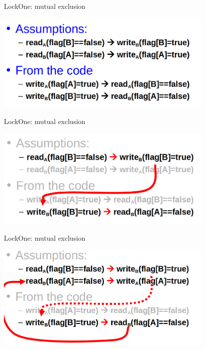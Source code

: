 \begin{frame}[fragile]{LockOne: mutual exclusion}
\begin{center}
  \includegraphics[width=0.8\textwidth]{./pics/lock1/combine-1.png}
\end{center}
\end{frame}

\begin{frame}{LockOne: mutual exclusion}
\begin{center}
  \includegraphics[width=0.8\textwidth]{./pics/lock1/combine-2.png}
\end{center}
\end{frame}

\begin{frame}{LockOne: mutual exclusion}
\begin{center}
  \includegraphics[width=0.8\textwidth]{./pics/lock1/combine-3.png}
\end{center}
\end{frame}


